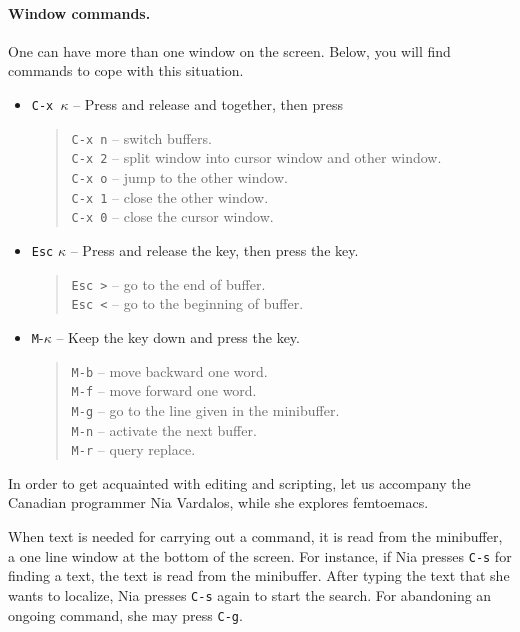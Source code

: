 \documentclass[a4paper,12pt]{book}
\begin{document}
\paragraph{Window commands.} One can have more
than one window on the screen. Below, you will
find commands to cope with this situation.
\begin{itemize}
\item \verb|C-x |$\kappa$ -- Press and release 
  and  together, then press \keys{$\kappa$} 
  \begin{quote}
    \verb|C-x n| -- switch buffers.\\
    \verb|C-x 2| -- split window into cursor window and other window.\\
    \verb|C-x o| -- jump to the other window.\\
    \verb|C-x 1| -- close the other window.\\
    \verb|C-x 0| -- close the cursor window.
  \end{quote}
\item \verb|Esc| $\kappa$ -- Press and release the  key,
  then press the \keys{$\kappa$} key.
\begin{quote}
  \verb|Esc >| -- go to the end of buffer.\\
  \verb|Esc <| -- go to the beginning of buffer. 
\end{quote}
\item \verb|M|-$\kappa$ -- Keep the  key
  down and press the \keys{$\kappa$} key.
\begin{quote}
  \verb|M-b| -- move backward one word.\\
  \verb|M-f| -- move forward one word.\\
  \verb|M-g| -- go to the line given in the minibuffer.\\
  \verb|M-n| -- activate the next buffer.\\
  \verb|M-r| -- query replace.
\end{quote}
\end{itemize}


In order to get acquainted with editing and scripting,
let us accompany the Canadian programmer Nia
Vardalos, while she explores femtoemacs.

When text is needed for carrying out a command,
it is read from the minibuffer, a one line
window at the bottom of the screen. For instance, 
if Nia presses \verb|C-s| for finding a text, 
the text is read from the minibuffer. After
typing the text that she wants to localize,
Nia presses \verb|C-s| again to start the search.
For abandoning an ongoing command, she may press \verb|C-g|.
\end{document}
